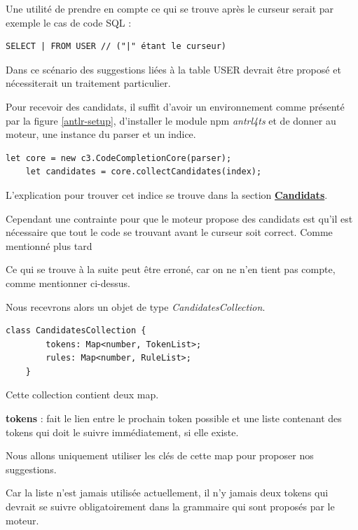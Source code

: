 \documentclass[
    iict, %
    il, %
]{heig-tb}
\begin{document}
Une utilité de prendre en compte ce qui se trouve après le curseur serait par exemple le cas de code SQL :

\begin{lstlisting}[frame=single]
SELECT | FROM USER // ("|" étant le curseur)
\end{lstlisting}

Dans ce scénario des suggestions liées à la table USER devrait être proposé et nécessiterait un traitement particulier.

Pour recevoir des candidats, il suffit d'avoir un environnement comme présenté par la figure \ref{antlr-setup}, d'installer le module npm \emph{antrl4ts} et
de donner au moteur, une instance du parser et un indice.

\begin{lstlisting}[frame=single] % TODO
    let core = new c3.CodeCompletionCore(parser);
    let candidates = core.collectCandidates(index);
\end{lstlisting}

L'explication pour trouver cet indice se trouve dans la section \hyperref[candidates]{\textbf{Candidats}}.

Cependant une contrainte pour que le moteur propose des candidats est qu'il est nécessaire que tout le code se trouvant avant le curseur soit correct.
Comme mentionné plus tard %

Ce qui se trouve à la suite peut être erroné, car on ne n'en tient pas compte, comme mentionner ci-dessus.

Nous recevrons alors un objet de type \emph{CandidatesCollection}.

\begin{lstlisting}[frame=single]
    class CandidatesCollection {
        tokens: Map<number, TokenList>;
        rules: Map<number, RuleList>;
    }
\end{lstlisting}

Cette collection contient deux map.

\textbf{tokens} : fait le lien entre le prochain token possible et une liste contenant des tokens qui doit le suivre immédiatement, si elle existe.

Nous allons uniquement utiliser les clés de cette map pour proposer nos suggestions.

Car la liste n'est jamais utilisée actuellement, il n'y jamais deux tokens qui devrait se suivre obligatoirement dans la grammaire qui sont proposés par le moteur.
\end{document}
